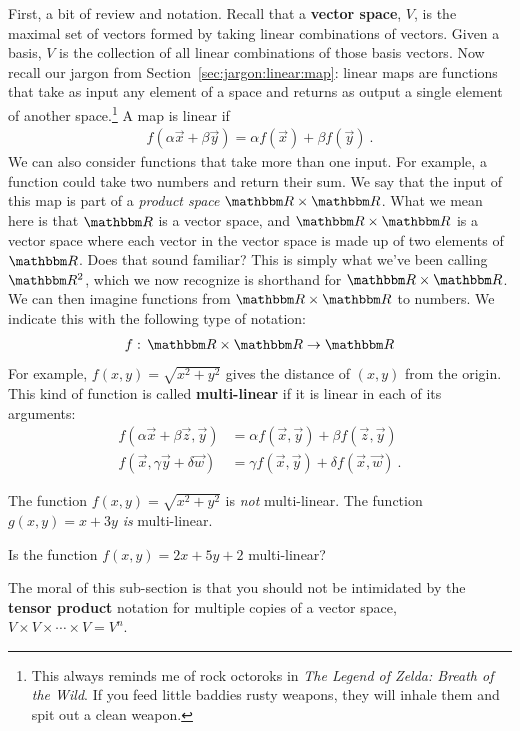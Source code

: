 \documentclass[12pt]{article}
\begin{document}
First, a bit of review and notation. Recall that a \textbf{vector space}, $V$, is the maximal set of vectors formed by taking linear combinations of vectors. Given a basis, $V$ is the collection of all linear combinations of those basis vectors. Now recall our jargon from Section~\ref{sec:jargon:linear:map}: linear maps are functions that take as input any element of a space and returns as output a single element of another space.\footnote{This always reminds me of rock octoroks in \emph{The Legend of Zelda: Breath of the Wild}. If you feed little baddies rusty weapons, they will inhale them and spit out a clean weapon.} A map is linear if
\begin{align}
    f(\alpha\vec{x} + \beta\vec{y}) = \alpha f(\vec{x}) + \beta f(\vec{y}) \ .
\end{align}
We can also consider functions that take more than one input. For example, a function could take two numbers and return their sum. We say that the input of this map is part of a \emph{product space} $\RR \times \RR$. What we mean here is that $\RR$ is a vector space, and $\RR\times \RR$ is a vector space where each vector in the vector space is made up of two elements of $\RR$. Does that sound familiar? This is simply what we've been calling $\RR^2$, which we now recognize is shorthand for $\RR \times \RR$. We can then imagine functions from $\RR\times \RR$ to numbers. We indicate this with the following type of notation:
\begin{align}
f:\, \RR \times \RR \to \RR    
\end{align}
For example, $f(x,y) = \sqrt{x^2 + y^2}$ gives the distance of $(x,y)$ from the origin. This kind of function is called \textbf{multi-linear} if it is linear in each of its arguments:
\begin{align}
    f(\alpha \vec{x} + \beta \vec{z}, \vec{y}) &= \alpha f(\vec{x},\vec{y}) + \beta f(\vec{z},\vec{y})
    \\
    f(\vec{x}, \gamma \vec{y} + \delta \vec{w}) &= \gamma f(\vec{x},\vec{y}) + \delta f(\vec{x},\vec{w}) \ .
\end{align}
\begin{example}
The function $f(x,y) = \sqrt{x^2 + y^2}$ is \emph{not} multi-linear. The function $g(x,y) = x+3y$ \emph{is} multi-linear.
\end{example}
\begin{example}
Is the function $f(x,y) = 2x + 5y + 2$ multi-linear?
\end{example}

The moral of this sub-section is that you should not be intimidated by the \textbf{tensor product} notation for multiple copies of a vector space, $V\times V\times \cdots \times V = V^n$. 
\end{document}
